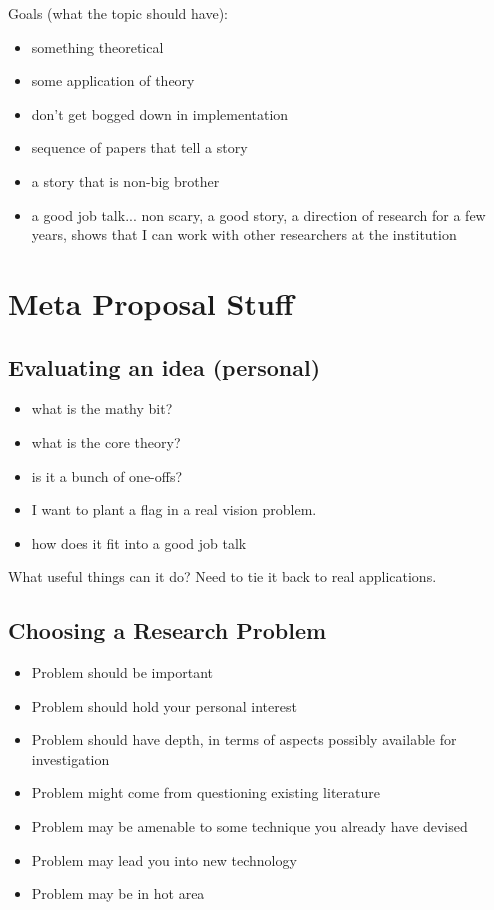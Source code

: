 Goals (what the topic should have):
\begin{itemize}
  \item something theoretical
  \item some application of theory
  \item don't get bogged down in implementation 
  \item sequence of papers that tell a story
  \item a story that is non-big brother
  \item a good job talk... non scary, a good story, a direction of
    research for a few years, shows that I can work with other
    researchers at the institution
\end{itemize}


\section{Meta Proposal Stuff}

\subsection{Evaluating an idea (personal)}
\begin{itemize}
  \item what is the mathy bit?
  \item what is the core theory?
  \item is it a bunch of one-offs?
  \item I want to plant a flag in a real vision problem.
  \item how does it fit into a good job talk
\end{itemize}

What useful things can it do?  Need to tie it back to real
applications.

\subsection{Choosing a Research Problem}

\begin{itemize}
  \item Problem should be important
  \item Problem should hold your personal interest
  \item Problem should have depth, in terms of aspects possibly
    available for investigation
  \item Problem might come from questioning existing literature
  \item Problem may be amenable to some technique you already have devised
  \item Problem may lead you into new technology
  \item Problem may be in hot area
\end{itemize}

